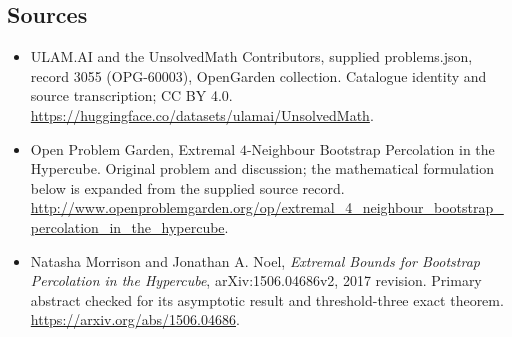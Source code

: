 \documentclass[11pt,a4paper]{article}
\begin{document}
\subsection{Sources}
\begin{itemize}
\item[S1] ULAM.AI and the UnsolvedMath Contributors, supplied problems.json, record 3055 (OPG-60003), OpenGarden collection. Catalogue identity and source transcription; CC BY 4.0.
\url{https://huggingface.co/datasets/ulamai/UnsolvedMath}.
\item[S2] Open Problem Garden, Extremal $4$-Neighbour Bootstrap Percolation in the Hypercube. Original problem and discussion; the mathematical formulation below is expanded from the supplied source record.
\url{http://www.openproblemgarden.org/op/extremal_4_neighbour_bootstrap_percolation_in_the_hypercube}.

\item[R1] Natasha Morrison and Jonathan A. Noel, \emph{Extremal
Bounds for Bootstrap Percolation in the Hypercube}, arXiv:1506.04686v2,
2017 revision. Primary abstract checked for its asymptotic result and
threshold-three exact theorem.
\url{https://arxiv.org/abs/1506.04686}.

\end{itemize}
\end{document}
